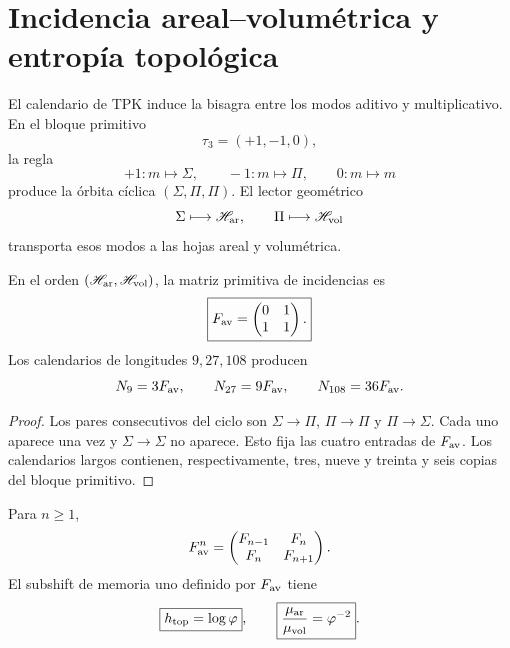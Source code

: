 \section{Incidencia areal--volumétrica y entropía topológica}

El calendario de TPK induce la bisagra entre los modos aditivo y
multiplicativo. En el bloque primitivo
\[
 \tau_3=(+1,-1,0),
\]
la regla
\[
 +1:m\mapsto\Sigma,
 \qquad
 -1:m\mapsto\Pi,
 \qquad
 0:m\mapsto m
\]
produce la órbita cíclica \((\Sigma,\Pi,\Pi)\). El lector geométrico
\[
 \Sigma\longmapsto\mathscr H_{\rm ar},
 \qquad
 \Pi\longmapsto\mathscr H_{\rm vol}
\]
transporta esos modos a las hojas areal y volumétrica.

\begin{theorem}
\label{thm:incidencia-hojas-anexo}
En el orden \((\mathscr H_{\rm ar},\mathscr H_{\rm vol})\), la matriz
primitiva de incidencias es
\begin{equation}
 \boxed{
 F_{\rm av}=
 \begin{pmatrix}0&1\\1&1\end{pmatrix}.}
 \label{eq:fav-anexo-informacion}
\end{equation}
Los calendarios de longitudes \(9,27,108\) producen
\[
 N_9=3F_{\rm av},
 \qquad N_{27}=9F_{\rm av},
 \qquad N_{108}=36F_{\rm av}.
\]
\end{theorem}

\begin{proof}
Los pares consecutivos del ciclo son
\(\Sigma\to\Pi\), \(\Pi\to\Pi\) y \(\Pi\to\Sigma\). Cada uno aparece una
vez y \(\Sigma\to\Sigma\) no aparece. Esto fija las cuatro entradas de
\(F_{\rm av}\). Los calendarios largos contienen, respectivamente, tres,
nueve y treinta y seis copias del bloque primitivo.
\end{proof}

\begin{theorem}
\label{thm:fibonacci-parry-anexo}
Para \(n\geq1\),
\begin{equation}
 F_{\rm av}^{n}
 =\begin{pmatrix}F_{n-1}&F_n\\F_n&F_{n+1}\end{pmatrix}.
 \label{eq:potencias-fav-anexo}
\end{equation}
El subshift de memoria uno definido por \(F_{\rm av}\) tiene
\begin{equation}
 \boxed{h_{\rm top}=\log\varphi},
 \qquad
 \boxed{\frac{\mu_{\rm ar}}{\mu_{\rm vol}}=\varphi^{-2}}.
 \label{eq:entropia-parry-hojas-anexo}
\end{equation}
\end{theorem}

